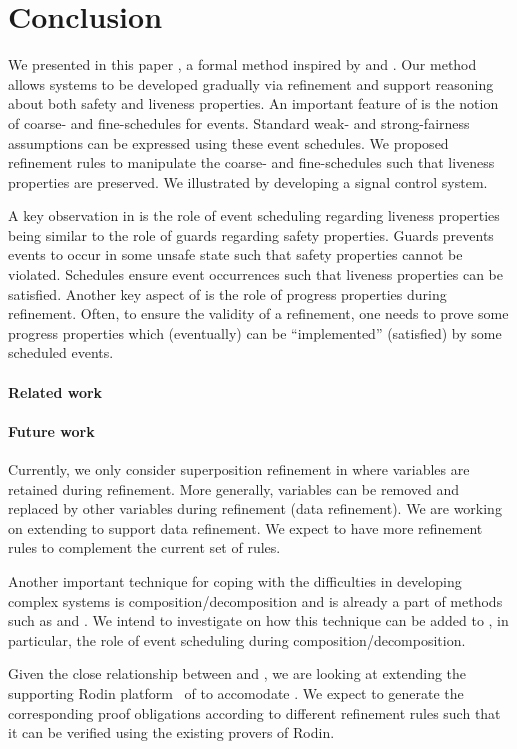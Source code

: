 \section{Conclusion}
\label{sec:conclusion}

We presented in this paper \unitb, a formal method inspired by \eventB
and \unity.  Our method allows systems to be developed gradually via
refinement and support reasoning about both safety and liveness
properties.  An important feature of \unitb is the notion of coarse-
and fine-schedules for events.  Standard weak- and strong-fairness
assumptions can be expressed using these event schedules.  We
proposed refinement rules to manipulate the coarse-
and fine-schedules such that liveness properties are
preserved.  We illustrated \unitb by developing a signal control
system.

A key observation in \unitb is the role of event scheduling regarding
liveness properties being similar to the role of guards regarding safety
properties.  Guards prevents events to occur in some unsafe state such
that safety properties cannot be violated.  Schedules ensure event
occurrences such that liveness properties can be satisfied.  Another
key aspect of \unitb is the role of progress properties during
refinement.  Often, to ensure the validity of a refinement, one needs
to prove some progress properties which (eventually) can be
``implemented'' (satisfied) by some scheduled events.

\paragraph{Related work}


\paragraph{Future work}

Currently, we only consider superposition refinement in \unitb where
variables are retained during refinement.  More generally, variables
can be removed and replaced by other variables during refinement (data
refinement).  We are working on extending \unitb to support data
refinement.  We expect to have more refinement rules to complement the
current set of rules.

Another important technique for coping with the difficulties in
developing complex systems is composition/decomposition and is already
a part of methods such as \eventB and \unity.  We intend to investigate
on how this technique can be added to \unitb, in particular, the role
of event scheduling during composition/decomposition.

Given the close relationship between \unitb and \eventB, we are
looking at extending the supporting Rodin
platform~\cite{abrial10:_rodin} of \eventB to accomodate \unitb.  We
expect to generate the corresponding proof obligations according to
different refinement rules such that it can be verified using the
existing provers of Rodin.



